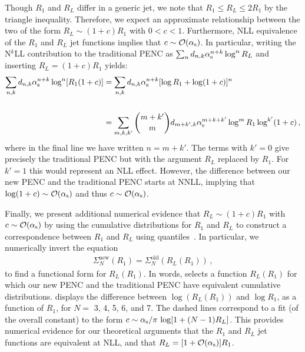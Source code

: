 Though \(R_1\) and \(R_L\) differ in a generic jet, we note that $R_1 \leq R_L \leq 2R_1$ by the triangle inequality.
%
Therefore, we expect an approximate relationship between the two of the form $R_L \sim (1+c) R_1$ with $0<c<1$.
%
Furthermore, NLL equivalence of the \(R_1\) and \(R_L\) jet functions implies that  $c \sim {\cal O}(\alpha_{\mathrm{s}})$.
%
In particular,
writing the N\(^k\)LL contribution to the traditional PENC as $\sum_{n} d_{n,k}\alpha_{\mathrm{s}}^{n+k}\log^n R_L$
and inserting $R_L = (1+c) R_1$ yields:
\begin{align}
    \label{eq:c_is_alphas}
   \sum_{n,k}
       d_{n,k} \alphas^{n+k}
       \log^n[
           R_1
           (1 +
           c)
       ]
   &=
   \sum_{n,k}
      d_{n,k} \alphas^{n+k}[\log R_1 +\log(1+c)]^n
  \nn \\
   &=
   \sum_{m,k,k'}
      {m+k' \choose m}
      d_{m+k', k} \alphas^{m+k+k'} \log^m R_1 \log^{k'} (1+c)
      \,,
\end{align}
where in the final line we have written \(n = m + k'\).
%
The terms with \(k' = 0\) give precisely the traditional PENC but with the argument \(R_L\) replaced by \(R_1\).
%
For \(k' = 1\) this would represent an NLL effect. However, the difference between our new PENC and the traditional PENC starts at NNLL, implying that $\log(1+c) \sim {\cal O}(\alpha_{\mathrm{s}})$ and thus $c \sim {\cal O}(\alpha_{\mathrm{s}})$.


Finally, we present additional numerical evidence that \(R_L \sim \left(1+c\right)R_1\) with \(c \sim \mathcal{O}(\alpha_{\mathrm{s}})\) by using the cumulative distributions for \(R_1\) and \(R_L\) to construct a correspondence between $R_1$ and $R_L$ using quantiles~\cite{Brewer:2018dfs}.
%
In particular, we numerically invert the equation
\begin{align}
   \label{eq:quantiles}
   \Sigma^\text{new}_{N}(R_1)
   =
   \Sigma^\text{old}_N(
       R_L
       (R_1)
   )
   \, ,
\end{align}
to find a functional form for \(R_L(R_1)\).
%
In words,  selects a function \(R_L(R_1)\) for which our new PENC and the traditional PENC have equivalent cumulative distributions.
%
 displays the difference between $\log(R_L(R_1))$ and $\log R_1$, as a function of $R_1$, for $N=$ 3, 4, 5, 6, and 7.
%
The dashed lines correspond to a fit (of the overall constant) to the form $c \sim \alpha_{\mathrm{s}}/\pi\, \log[1+(N-1) R_L]$.
%
This provides numerical evidence for our theoretical arguments that the \(R_1\) and \(R_L\) jet functions are equivalent at NLL, and that $R_L = [1 + {\mathcal O}(\alpha_{\mathrm{s}})] R_1$.

